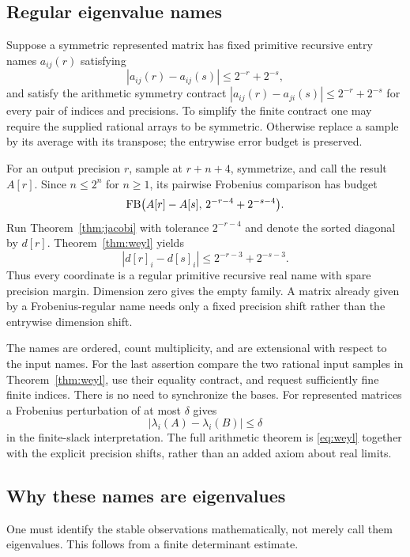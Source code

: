 \subsection{Regular eigenvalue names}

Suppose a symmetric represented matrix has fixed primitive recursive entry names $a_{ij}(r)$ satisfying
\[
 |a_{ij}(r)-a_{ij}(s)|\le2^{-r}+2^{-s},
\]
and satisfy the arithmetic symmetry contract $|a_{ij}(r)-a_{ji}(s)|\le2^{-r}+2^{-s}$ for every pair of indices and precisions. To simplify the finite contract one may require the supplied rational arrays to be symmetric. Otherwise replace a sample by its average with its transpose; the entrywise error budget is preserved.

For an output precision $r$, sample at $r+n+4$, symmetrize, and call the result $A[r]$. Since $n\le2^n$ for $n\ge1$, its pairwise Frobenius comparison has budget
\[
 \operatorname{FB}\bigl(A[r]-A[s],\,2^{-r-4}+2^{-s-4}\bigr).
\]
Run Theorem~\ref{thm:jacobi} with tolerance $2^{-r-4}$ and denote the sorted diagonal by $d[r]$. Theorem~\ref{thm:weyl} yields
\begin{equation}
 |d[r]_i-d[s]_i|\le2^{-r-3}+2^{-s-3}. \label{eq:name}
\end{equation}
Thus every coordinate is a regular primitive recursive real name with spare precision margin. Dimension zero gives the empty family. A matrix already given by a Frobenius-regular name needs only a fixed precision shift rather than the entrywise dimension shift.

The names are ordered, count multiplicity, and are extensional with respect to the input names. For the last assertion compare the two rational input samples in Theorem~\ref{thm:weyl}, use their equality contract, and request sufficiently fine finite indices. There is no need to synchronize the bases. For represented matrices a Frobenius perturbation of at most $\delta$ gives
\[
 |\lambda_i(A)-\lambda_i(B)|\le\delta
\]
in the finite-slack interpretation. The full arithmetic theorem is \eqref{eq:weyl} together with the explicit precision shifts, rather than an added axiom about real limits.

\subsection{Why these names are eigenvalues}

One must identify the stable observations mathematically, not merely call them eigenvalues. This follows from a finite determinant estimate.

